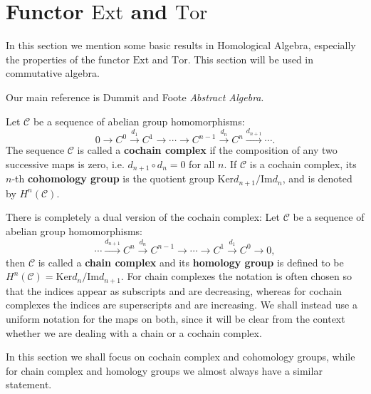 \section{Functor $\mathrm{Ext}$ and $\mathrm{Tor}$}
In this section we mention some basic results in Homological Algebra, especially the properties of the functor $\mathrm{Ext}$ and $\mathrm{Tor}$. This section will be used in commutative algebra.\par
Our main reference is Dummit and Foote \textit{Abstract Algebra}.
\begin{definition}
Let $\mathcal{C}$ be a sequence of abelian group homomorphisms: 
$$
0\longrightarrow C^0\overset{d_1}{\longrightarrow}C^1\longrightarrow \cdots \longrightarrow C^{n-1}\overset{d_n}{\longrightarrow}C^n\overset{d_{n+1}}{\longrightarrow}\cdots .
$$
The sequence $\mathcal{C}$ is called a \textbf{cochain complex} if the composition of any two successive maps is zero, i.e. $d_{n+1}\circ d_n=0$ for all $n$. If $\mathcal{C}$ is a cochain complex, its $n$-th \textbf{cohomology group} is the quotient group $\mathrm{Ker}d_{n+1}/\mathrm{Im}d_n$, and is denoted by $H^n(\mathcal{C})$.
\end{definition}
There is completely a dual version of the cochain complex: Let $\mathcal{C}$ be a sequence of abelian group homomorphisms: 
$$
\cdots \overset{d_{n+1}}{\longrightarrow}C^n\overset{d_n}{\longrightarrow}C^{n-1}\longrightarrow \cdots \longrightarrow C^1\overset{d_1}{\longrightarrow}C^0\longrightarrow 0,
$$
then $\mathcal{C}$ is called a \textbf{chain complex} and its \textbf{homology group} is defined to be $H^n(\mathcal{C})=\mathrm{Ker}d_n/\mathrm{Im}d_{n+1}$.  For chain complexes the notation is often chosen so that the indices appear as subscripts and are decreasing, whereas for cochain complexes the indices are superscripts and are increasing. We shall instead use a uniform notation for the maps on both, since it will be clear from the context whether we are dealing with a chain or a cochain complex.\par
In this section we shall focus on cochain complex and cohomology groups, while for chain complex and homology groups we almost always have a similar statement.\par
